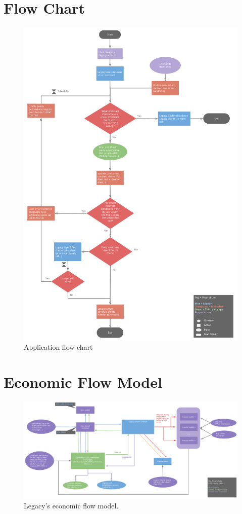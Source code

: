 \chapter{Flow Chart} %
\label{cha:flow_chart}
\begin{figure}
	\centering
	\includegraphics[scale=0.25]{fig/flow_chart_short_version.pdf}
	\caption{Application flow chart}
\end{figure}


\chapter{Economic Flow Model} %
\label{cha:economic_flow_model}
\begin{figure}
	\centering
	\includegraphics[scale=0.3]{fig/profit_sharing_model_v02.pdf}
	\caption{Legacy's economic flow model.}
\end{figure}

